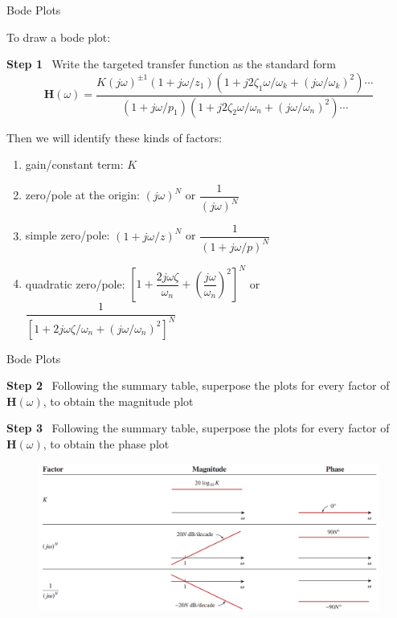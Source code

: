 \documentclass{beamer}
\begin{document}

\begin{frame}{Bode Plots}

To draw a bode plot:

\vspace{0.3cm}

\textbf{Step 1} \ Write the targeted transfer function as the standard form
$$\mathbf{H}(\omega) = \frac{ K(j\omega)^{\pm1}(1+j\omega/z_1)(1+j2\zeta_1\omega/\omega_k+(j\omega/\omega_k)^2)\cdots }{ (1+j\omega/p_1)(1+j2\zeta_2\omega/\omega_n + (j\omega/\omega_n)^2) \cdots } $$

Then we will identify these kinds of factors:


\begin{enumerate}
\item gain/constant term: $K$
\item zero/pole at the origin: $(j \omega)^{N}$ or $\dfrac{1}{(j \omega)^{N}}$
\item simple zero/pole: $(1+j \omega /z)^{N}$ or $\dfrac{1}{(1+j \omega /p)^{N}}$
\item quadratic zero/pole: $[1+\dfrac{2j \omega \zeta}{\omega _n}+ (\dfrac{j \omega}{\omega _n})^{2}]^{N}$ or $\dfrac{1}{[1+2j \omega \zeta/\omega_{n}+(j \omega / \omega _{n})^{2} ]^{N}}$
\end{enumerate}

\end{frame}


\begin{frame}{Bode Plots}


\textbf{Step 2} \ Following the summary table, superpose the plots for every factor of $\mathbf{H}(\omega)$, to obtain the magnitude plot

\textbf{Step 3} \ Following the summary table, superpose the plots for every factor of $\mathbf{H}(\omega)$, to obtain the phase plot

\begin{figure}[H]
    \centering
    \includegraphics[width=\textwidth]{C14/bode1.png}
\end{figure}
    
\end{frame}
\end{document}
